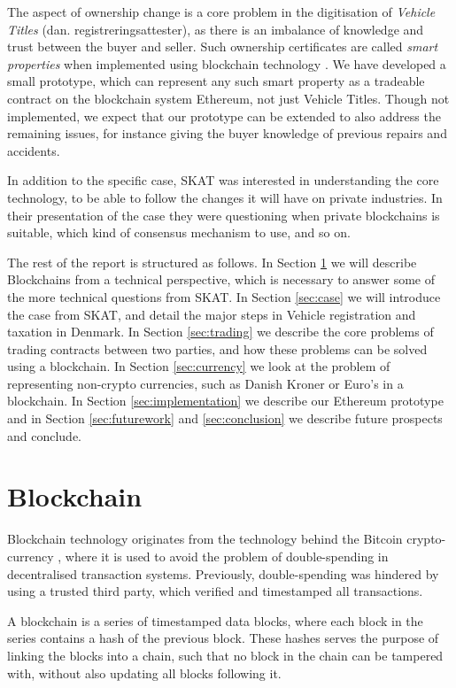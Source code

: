 \documentclass[oneside,a4paper,10pts,article]{memoir}
\begin{document}
The aspect of ownership change is a core problem in the digitisation
of \textit{Vehicle Titles} (dan. registreringsattester), as there is
an imbalance of knowledge and trust between the buyer and seller. Such
ownership certificates are called \textit{smart properties} when
implemented using blockchain technology
\cite{bitcoinwiki-smartprop}. We have developed a small prototype,
which can represent any such smart property as a tradeable contract on
the blockchain system Ethereum, not just Vehicle Titles. Though not
implemented, we expect that our prototype can be extended to also
address the remaining issues, for instance giving the buyer knowledge
of previous repairs and accidents.

In addition to the specific case, SKAT was interested in understanding
the core technology, to be able to follow the changes it will have on
private industries. In their presentation of the case they were
questioning when private blockchains is suitable, which kind of
consensus mechanism to use, and so on.

The rest of the report is structured as follows. In Section
\ref{sec:blockchain} we will describe Blockchains from a technical
perspective, which is necessary to answer some of the more technical
questions from SKAT. In Section \ref{sec:case} we will introduce the
case from SKAT, and detail the major steps in Vehicle registration and
taxation in Denmark. In Section \ref{sec:trading} we describe the core
problems of trading contracts between two parties, and how these
problems can be solved using a blockchain. In Section
\ref{sec:currency} we look at the problem of representing non-crypto
currencies, such as Danish Kroner or Euro's in a blockchain. In
Section \ref{sec:implementation} we describe our Ethereum prototype
and in Section \ref{sec:futurework} and \ref{sec:conclusion} we
describe future prospects and conclude.

\chapter{Blockchain}
\label{sec:blockchain}
Blockchain technology originates from the technology behind the
Bitcoin crypto-currency \cite{bitcoin}, where it is used to avoid the
problem of double-spending in decentralised transaction
systems. Previously, double-spending was hindered by using a trusted
third party, which verified and timestamped all transactions.

A blockchain is a series of timestamped data blocks, where each block
in the series contains a hash of the previous block. These hashes
serves the purpose of linking the blocks into a chain, such that no
block in the chain can be tampered with, without also updating all
blocks following it.
\end{document}
